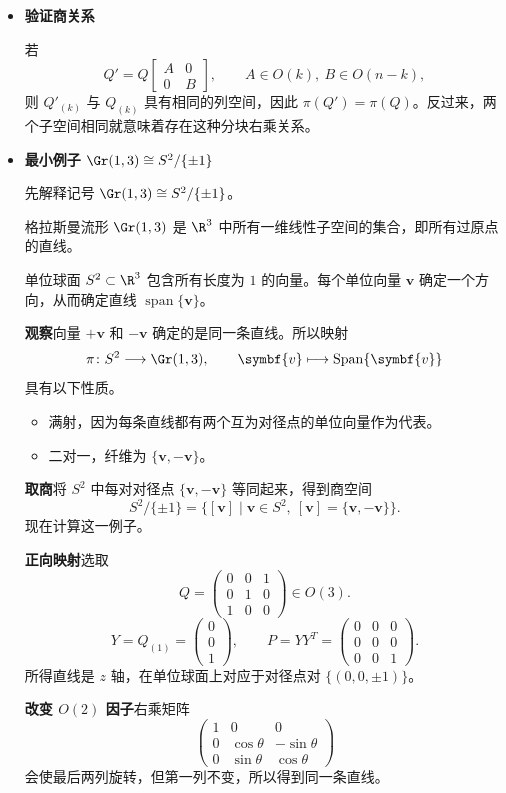 \begin{itemize}
  \item \textbf{验证商关系}

  若
  \[
    Q'=Q\begin{bmatrix}A&0\\0&B\end{bmatrix},
    \qquad A\in O(k),\ B\in O(n-k),
  \]
  则 $Q'_{(k)}$ 与 $Q_{(k)}$ 具有相同的列空间，因此 $\pi(Q')=\pi(Q)$。反过来，两个子空间相同就意味着存在这种分块右乘关系。

  \item \textbf{最小例子 $\Gr(1,3)\cong S^2/\{\pm1\}$}

  先解释记号 $\Gr(1,3)\cong S^2/\{\pm1\}$。

  格拉斯曼流形 $\Gr(1,3)$ 是 $\R^3$ 中所有一维线性子空间的集合，即所有过原点的直线。

  单位球面 $S^2\subset\R^3$ 包含所有长度为 $1$ 的向量。每个单位向量 $\symbf{v}$ 确定一个方向，从而确定直线 $\operatorname{span}\{\symbf{v}\}$。

  \textbf{观察}\quad 向量 $+\symbf{v}$ 和 $-\symbf{v}$ 确定的是同一条直线。所以映射
  \[
    \pi\colon S^2\longrightarrow\Gr(1,3),\qquad
    \symbf{v}\longmapsto\operatorname{Span}\{\symbf{v}\}
  \]
  具有以下性质。
  \begin{itemize}
    \item 满射，因为每条直线都有两个互为对径点的单位向量作为代表。
    \item 二对一，纤维为 $\{\symbf{v},-\symbf{v}\}$。
  \end{itemize}

  \textbf{取商}\quad 将 $S^2$ 中每对对径点 $\{\symbf{v},-\symbf{v}\}$ 等同起来，得到商空间
  \[
    S^2/\{\pm1\}
      =\{[\symbf{v}]\mid\symbf{v}\in S^2,\ [\symbf{v}]=\{\symbf{v},-\symbf{v}\}\}.
  \]
  现在计算这一例子。

  \textbf{正向映射}\quad 选取
  \[
    Q=\begin{pmatrix}0&0&1\\0&1&0\\1&0&0\end{pmatrix}\in O(3).
  \]
  \[
    Y=Q_{(1)}=\begin{pmatrix}0\\0\\1\end{pmatrix},\qquad
    P=YY^T=\begin{pmatrix}0&0&0\\0&0&0\\0&0&1\end{pmatrix}.
  \]
  所得直线是 $z$ 轴，在单位球面上对应于对径点对 $\{(0,0,\pm1)\}$。

  \textbf{改变 $O(2)$ 因子}\quad 右乘矩阵
  \[
    \begin{pmatrix}
      1&0&0\\
      0&\cos\theta&-\sin\theta\\
      0&\sin\theta&\cos\theta
    \end{pmatrix}
  \]
  会使最后两列旋转，但第一列不变，所以得到同一条直线。
\end{itemize}

